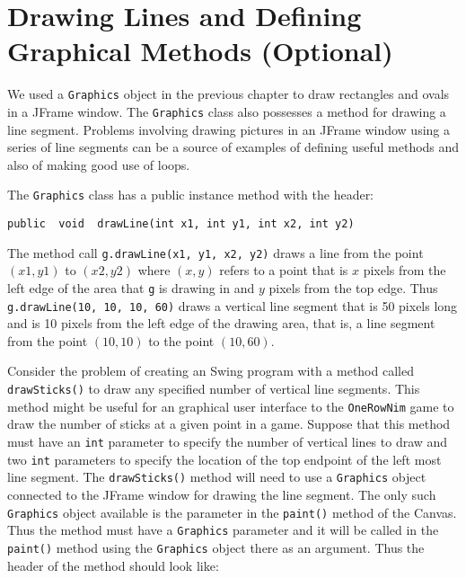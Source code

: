 \section{Drawing Lines and Defining Graphical Methods (Optional)}

We used a  {\tt Graphics} object in the previous chapter to draw
rectangles and ovals in a JFrame window. The {\tt Graphics} class
also possesses a method for drawing a line segment. 
Problems involving drawing pictures in an JFrame window using a 
series of line segments can be a source of examples of defining 
useful methods and also of making good use of loops.

The {\tt Graphics} class has a public instance method with
the header:

\begin{jjjlisting}
\begin{lstlisting}
public  void  drawLine(int x1, int y1, int x2, int y2)
\end{lstlisting}
\end{jjjlisting}

\noindent The method call  {\tt g.drawLine(x1, y1, x2, y2)}
draws a line from the point $(x1,y1)$ to $(x2,y2)$ where $(x,y)$
refers to a point that is $x$ pixels from the left edge of
the area that {\tt g} is drawing in and $y$ pixels from the
top edge.  Thus {\tt g.drawLine(10, 10, 10, 60)} draws a
vertical line segment that is 50 pixels long and is 10 pixels
from the left edge of the drawing area, that is, a line
segment from the point $(10,10)$ to the point $(10,60)$.

Consider the problem of creating an Swing program with a
method called {\tt drawSticks()} to draw any specified 
number of vertical line segments.
This method might be useful for an graphical user interface
to the {\tt OneRowNim} game to draw the number of sticks 
at a given point in a game.  Suppose that this method must have an
{\tt int} parameter to specify the number of vertical lines to draw
and two {\tt int} parameters to specify the location of
the top endpoint of the left most line segment.  The  {\tt drawSticks()}
method will need to use a {\tt Graphics} object connected to the
JFrame window for drawing the line segment.  The only such 
{\tt Graphics} object available is the parameter in  the {\tt paint()}
method of the Canvas.  Thus the method must have a {\tt Graphics}
parameter and it will be called in the {\tt paint()} method
using the {\tt Graphics} object there
as an argument. Thus the header of the method should look like:

